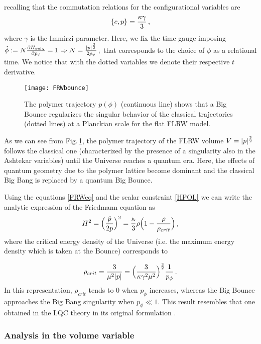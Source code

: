 \documentclass[aps,prd,twocolumn,nofootinbib,superscriptaddress]{revtex4-2}
\begin{document}
recalling that the commutation relations for the configurational variables are
\begin{equation} \{c, p\}={\kappa\gamma\over3}\,,
\end{equation}
where $\gamma$ is the Immirzi parameter. Here, we fix the time gauge imposing $\dot \phi:=N{{\partial H_{poly}}\over{\partial p_\phi}}=1 \Rightarrow N={|p|^{3\over2}\over{ 2 p_\phi}}\,,$ that corresponds to the choice of $\phi$ as a relational time. We notice that with the dotted variables we denote their respective $t$ derivative.	
\begin{figure}[h!]
	\centering
	\texttt{[image: FRWbounce]}
	\caption{The polymer trajectory $p(\phi)$ (continuous line) shows that a Big Bounce regularizes the singular behavior of the classical trajectories (dotted lines) at a Planckian scale for the flat FLRW model.}
	\label{FRWbounce}
\end{figure}
	
As we can see from Fig.$\,$\ref{FRWbounce}, the polymer trajectory of the FLRW volume $V=|p|^{3\over2}$ follows the classical one (characterized by the presence of a singularity also in the Ashtekar variables) until the Universe reaches a quantum era. Here, the effects of quantum geometry due to the polymer lattice become dominant and the classical Big Bang is replaced by a quantum Big Bounce.

Using the equations \eqref{FRWeq} and the scalar constraint \eqref{HPOL} we can write the analytic expression of the Friedmann equation as
\begin{equation}
	\label{FRWFriedmann}
	H^{2}=\Big({\dot p\over 2p} \Big)^{2}={\kappa\over3}\rho\Big(1-{\rho\over\rho_{crit}} \Big)\,,
\end{equation}
where the critical energy density of the Universe (i.e. the maximum energy density which is taken at the Bounce) corresponds to

\begin{equation} \rho_{crit}=\frac{3}{\mu^2|p|}=\Big( {3\over{\kappa\gamma^{2}\mu^{2}}}\Big)^{3\over2}{1\over p_{\phi}}\,.
	\label{rhoashFLRW}
\end{equation}	
In this representation, $\rho_{crit}$ tends to $0$ when $p_{\phi}$ increases, whereas the Big Bounce approaches the Big Bang singularity when $p_{\phi}\ll1$. This result resembles that one obtained in the LQC theory in its original formulation \cite{Ashtekar2006}.
		
\subsubsection{\small Analysis in the volume variable\label{FRWV}}
	
\end{document}
